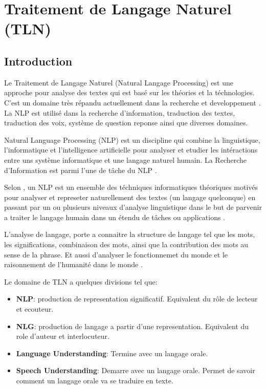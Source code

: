 \section{Traitement de Langage Naturel (TLN)}
\subsection{Introduction}
Le Traitement de Langage Naturel (Natural Langage Processing) est une approche pour analyse des textes qui est basé sur les théories et la téchnologies. C'est un domaine très répandu actuellement dans la recherche et developpement \citep{natural-language-processing}. La NLP est utilisé dans la recherche d'information, traduction des textes, traduction des voix, système de question reponse ainsi que diverses domaines.

\begin{definition}[NLP]
    Natural Language Processing (NLP) est un discipline qui combine la linguistique, l'informatique et l'intelligence artificielle pour analyser et etudier les intéractions entre uns système informatique et une langage naturel humain. La Recherche d'Information est parmi l'une de tâche du NLP \citep{art-nlp}.
\end{definition}

\begin{definition}[NLP]
    Selon \citeauthor{natural-language-processing}, un NLP est un ensemble des téchniques informatiques théoriques motivés pour analyser et represeter naturellement des textes (un langage quelconque) en passant par un ou plusieurs niveaux d'analyse linguistique dans le but de parvenir a traiter le langage humain dans un étendu de tâches ou applications \citep{natural-language-processing}.
\end{definition}

L'analyse de langage, porte a connaitre la structure de langage tel que les mots, les significations, combinaison des mots, ainsi que la contribution des mots au sense de la phrase. Et aussi d'analyser le fonctionnemet du monde et le raisonnement de l'humanité dans le monde \citep{automatic-nlp}.

Le domaine de TLN a quelques divisions tel que:
\begin{itemize}
    \item \textbf{NLP}: production de representation significatif. Equivalent du rôle de lecteur et ecouteur.
    \item \textbf{NLG}: production de langage a partir d'une representation. Equivalent du role d'auteur et interlocuteur.
    \item \textbf{Language Understanding}: Termine avec un langage orale.
    \item \textbf{Speech Understanding}: Demarre avec un langage orale. Permet de savoir comment un langage orale va se traduire en texte.
\end{itemize}

